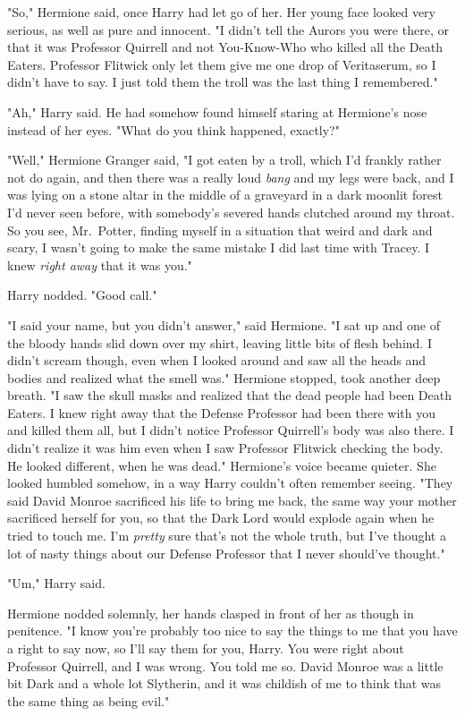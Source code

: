"So," Hermione said, once Harry had let go of her. Her young face looked very
serious, as well as pure and innocent. "I didn't tell the Aurors you were
there, or that it was Professor Quirrell and not You-Know-Who who killed all
the Death Eaters. Professor Flitwick only let them give me one drop of
Veritaserum, so I didn't have to say. I just told them the troll was the last
thing I remembered."

"Ah," Harry said. He had somehow found himself staring at Hermione's nose
instead of her eyes. "What do you think happened, exactly?"

"Well," Hermione Granger said, "I got eaten by a troll, which I'd
frankly rather not do again, and then there was a really loud \emph{bang} and
my legs were back, and I was lying on a stone altar in the middle of a
graveyard in a dark moonlit forest I'd never seen before, with somebody's
severed hands clutched around my throat. So you see, Mr.~Potter, finding myself
in a situation that weird and dark and scary, I wasn't going to make the same
mistake I did last time with Tracey. I knew \emph{right away} that it was you."

Harry nodded. "Good call."

"I said your name, but you didn't answer," said Hermione. "I sat up and one of
the bloody hands slid down over my shirt, leaving little bits of flesh behind.
I didn't scream though, even when I looked around and saw all the heads and
bodies and realized what the smell was." Hermione stopped, took another deep
breath. "I saw the skull masks and realized that the dead people had been Death
Eaters. I knew right away that the Defense Professor had been there with you
and killed them all, but I didn't notice Professor Quirrell's body was also
there. I didn't realize it was him even when I saw Professor Flitwick checking
the body. He looked{\el} different, when he was dead." Hermione's voice
became quieter. She looked humbled somehow, in a way Harry couldn't often
remember seeing. "They said David Monroe sacrificed his life to bring me back,
the same way your mother sacrificed herself for you, so that the Dark Lord
would explode again when he tried to touch me. I'm \emph{pretty} sure that's
not the whole truth, but{\el} I've thought a lot of nasty things about our
Defense Professor that I never should've thought."

"Um," Harry said.

Hermione nodded solemnly, her hands clasped in front of her as though in
penitence. "I know you're probably too nice to say the things to me that you
have a right to say now, so I'll say them for you, Harry. You were right about
Professor Quirrell, and I was wrong. You told me so. David Monroe was a little
bit Dark and a whole lot Slytherin, and it was childish of me to think that was
the same thing as being evil."

